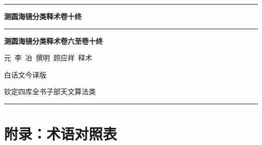 \documentclass[11pt,a4paper]{article}
\begin{document}
\vspace{1em}
\begin{center}
\rule{0.5\textwidth}{0.4pt}

\textbf{\textcolor{volumecolor}{测圆海镜分类释术卷十终}}
\end{center}

\vspace{2em}


\begin{center}
\rule{0.6\textwidth}{0.5pt}

\vspace{1em}

\textbf{\textcolor{volumecolor}{\LARGE 测圆海镜分类释术卷六至卷十终}}

\vspace{1em}

{\small\textcolor{classicalcolor}{元~李~冶~撰}\qquad\textcolor{classicalcolor}{明~顾应祥~释术}}

\vspace{0.5em}

{\small\textcolor{moderncolor}{白话文今译版}}

\vspace{0.5em}

{\small 钦定四库全书\quad 子部\quad 天文算法类}

\vspace{1em}

\rule{0.6\textwidth}{0.5pt}
\end{center}

\vspace{2em}

\newpage
\section*{\textcolor{volumecolor}{附录：术语对照表}}
\end{document}
